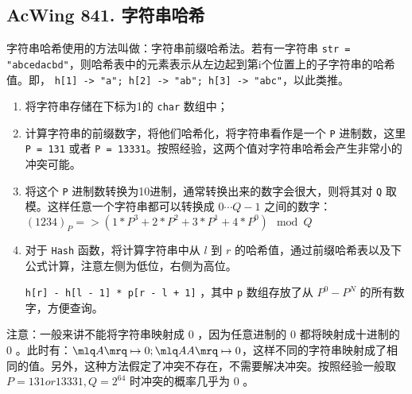 \subsection{AcWing 841. 字符串哈希}

字符串哈希使用的方法叫做：字符串前缀哈希法。若有一字符串 \lstinline{str = "abcedacbd"}，则哈希表中的元素表示从左边起到第i个位置上的子字符串的哈希值。即， \lstinline{h[1] -> "a"; h[2] -> "ab"; h[3] -> "abc"}，以此类推。

\begin{enumerate}
    \item 将字符串存储在下标为1的 \lstinline{char} 数组中；
    \item 计算字符串的前缀数字，将他们哈希化，将字符串看作是一个 \lstinline{P} 进制数，这里 \lstinline{P = 131} 或者 \lstinline{P = 13331}。按照经验，这两个值对字符串哈希会产生非常小的冲突可能。
    \item 将这个 \lstinline{P} 进制数转换为10进制，通常转换出来的数字会很大，则将其对 \lstinline{Q} 取模。这样任意一个字符串都可以转换成 $0 \cdots Q - 1$ 之间的数字：$(1234)_P => (1 * P^3 + 2 * P^2 + 3 * P^1 + 4 * P^0) \mod Q$
    \item 对于 \lstinline{Hash} 函数，将计算字符串中从 $l$ 到 $r$ 的哈希值，通过前缀哈希表以及下公式计算，注意左侧为低位，右侧为高位。
    
    \lstinline{h[r] - h[l - 1] * p[r - l + 1]} ，其中 \lstinline{p} 数组存放了从 $P^0 - P^N$ 的所有数字，方便查询。
\end{enumerate}

注意：一般来讲不能将字符串映射成 $0$ ，因为任意进制的 $0$ 都将映射成十进制的 $0$ 。此时有：$\mlq A \mrq \mapsto 0; \mlq AA \mrq \mapsto 0$，这样不同的字符串映射成了相同的值。另外，这种方法假定了冲突不存在，不需要解决冲突。按照经验一般取 $P = 131 or 13331, Q = 2^{64}$ 时冲突的概率几乎为 $0$ 。

